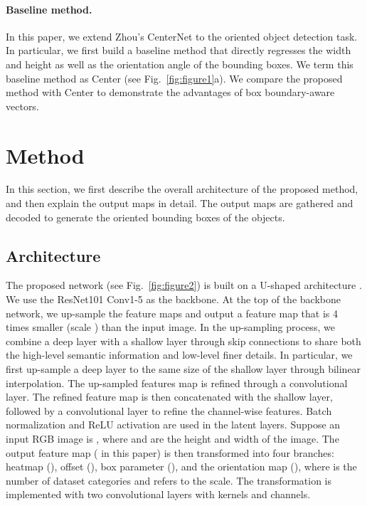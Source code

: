 \documentclass[10pt,twocolumn,letterpaper]{article}
\begin{document}
\paragraph{Baseline method.}  In this paper, we extend Zhou's CenterNet to the oriented object detection task. In particular, we first build a baseline method that directly regresses the width  and height  as well as the orientation angle  of the bounding boxes. We term this baseline method as Center (see Fig.~\ref{fig:figure1}a). We compare the proposed method with Center to demonstrate the advantages of box boundary-aware vectors.

\section{Method}
In this section, we first describe the overall architecture of the proposed method, and then explain the output maps in detail. The output maps are gathered and decoded to generate the oriented bounding boxes of the objects.

\subsection{Architecture}
\label{sub:architecture}
The proposed network (see Fig.~\ref{fig:figure2}) is built on a U-shaped architecture \cite{ronneberger2015u}. We use the ResNet101 Conv1-5 \cite{he2016deep} as the backbone. At the top of the backbone network, we up-sample the feature maps and output a feature map that is 4 times smaller (scale ) than the input image. In the up-sampling process, we combine a deep layer with a shallow layer through skip connections to share both the high-level semantic information and low-level finer details. In particular, we first up-sample a deep layer to the same size of the shallow layer through bilinear interpolation. The up-sampled features map is refined through a  convolutional layer. The refined feature map is then concatenated with the shallow layer, followed by a  convolutional layer to refine the channel-wise features. Batch normalization and ReLU activation are used in the latent layers. Suppose an input RGB image is , where  and  are the height and width of the image. The output feature map  ( in this paper) is then transformed into four branches: heatmap (), offset (), box parameter (), and the orientation map (), where  is the number of dataset categories and  refers to the scale. The transformation is implemented with two convolutional layers with  kernels and  channels.
\end{document}
